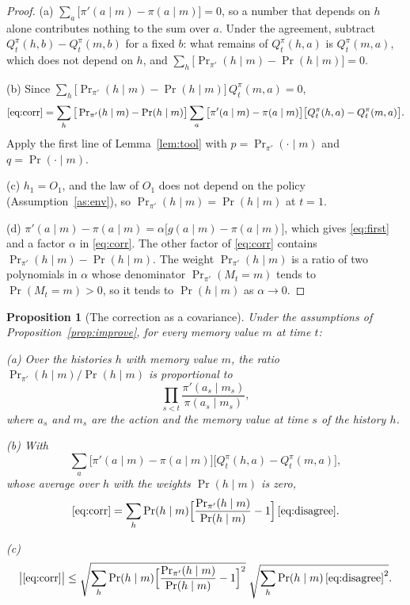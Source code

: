 \documentclass{article}
\newtheorem{proposition}{Proposition}[section]
\theoremstyle{definition}
\numberwithin{equation}{section}
\newcommand{\Prn}{\Pr\nolimits_{\pi'}}
\begin{document}
\begin{proof}
(a) $\sum_a\big[\pi'(a\mid m)-\pi(a\mid m)\big]=0$, so a number that depends on $h$ alone contributes nothing to the sum over $a$. Under the agreement, subtract $Q^\pi_t(h,b)-Q^\pi_t(m,b)$ for a fixed $b$: what remains of $Q^\pi_t(h,a)$ is $Q^\pi_t(m,a)$, which does not depend on $h$, and $\sum_h\big[\Prn(h\mid m)-\Pr(h\mid m)\big]=0$.

(b) Since $\sum_h\big[\Prn(h\mid m)-\Pr(h\mid m)\big]\,Q^\pi_t(m,a)=0$,
\[
\eqref{eq:corr}=\sum_h\big[\Prn(h\mid m)-\Pr(h\mid m)\big]\sum_a\big[\pi'(a\mid m)-\pi(a\mid m)\big]\big[Q^\pi_t(h,a)-Q^\pi_t(m,a)\big].
\]
Apply the first line of Lemma~\ref{lem:tool} with $p=\Prn(\cdot\mid m)$ and $q=\Pr(\cdot\mid m)$.

(c) $h_1=O_1$, and the law of $O_1$ does not depend on the policy (Assumption~\ref{as:env}), so $\Prn(h\mid m)=\Pr(h\mid m)$ at $t=1$.

(d) $\pi'(a\mid m)-\pi(a\mid m)=\alpha\big[g(a\mid m)-\pi(a\mid m)\big]$, which gives \eqref{eq:first} and a factor $\alpha$ in \eqref{eq:corr}. The other factor of \eqref{eq:corr} contains $\Prn(h\mid m)-\Pr(h\mid m)$. The weight $\Prn(h\mid m)$ is a ratio of two polynomials in $\alpha$ whose denominator $\Prn(M_t=m)$ tends to $\Pr(M_t=m)>0$, so it tends to $\Pr(h\mid m)$ as $\alpha\to0$.
\end{proof}

\begin{proposition}[The correction as a covariance]\label{prop:cov}
Under the assumptions of Proposition~\ref{prop:improve}, for every memory value $m$ at time $t$:

(a) Over the histories $h$ with memory value $m$, the ratio $\Prn(h\mid m)/\Pr(h\mid m)$ is proportional to
\[
\prod_{s<t}\frac{\pi'(a_s\mid m_s)}{\pi(a_s\mid m_s)},
\]
where $a_s$ and $m_s$ are the action and the memory value at time $s$ of the history $h$.

(b) With
\begin{equation}\label{eq:disagree}
\sum_a\big[\pi'(a\mid m)-\pi(a\mid m)\big]\big[Q^\pi_t(h,a)-Q^\pi_t(m,a)\big],
\end{equation}
whose average over $h$ with the weights $\Pr(h\mid m)$ is zero,
\[
\eqref{eq:corr}=\sum_h\Pr(h\mid m)\Big[\frac{\Prn(h\mid m)}{\Pr(h\mid m)}-1\Big]\,\eqref{eq:disagree}.
\]

(c)
\[
\big|\eqref{eq:corr}\big|\le\sqrt{\sum_h\Pr(h\mid m)\Big[\frac{\Prn(h\mid m)}{\Pr(h\mid m)}-1\Big]^2}\;\sqrt{\sum_h\Pr(h\mid m)\,\eqref{eq:disagree}^2}.
\]
\end{proposition}
\end{document}
